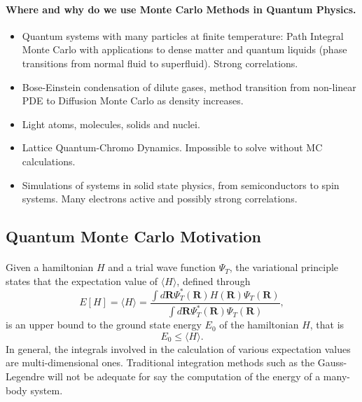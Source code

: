 \documentclass[%
twoside,                 %
final,                   %
10pt]{article}
\begin{document}
\paragraph{Where and why do we use Monte Carlo Methods in Quantum Physics.}
\begin{itemize}
\item Quantum systems with many particles at finite temperature: Path Integral Monte Carlo with applications to dense matter and quantum liquids (phase transitions from normal fluid to superfluid). Strong correlations.

\item Bose-Einstein condensation of dilute gases, method transition from  non-linear PDE to Diffusion Monte Carlo as density increases.

\item Light atoms, molecules, solids and nuclei. 

\item Lattice Quantum-Chromo Dynamics. Impossible to solve without MC calculations. 

\item Simulations of systems in solid state physics, from semiconductors to spin systems. Many electrons active and possibly strong correlations.
\end{itemize}

\noindent



\subsection*{Quantum Monte Carlo Motivation}

\paragraph{}
Given a hamiltonian $H$ and a trial wave function $\Psi_T$, the variational principle states that the expectation value of $\langle H \rangle$, defined through 
\[
   E[H]= \langle H \rangle =
   \frac{\int d\bm{R}\Psi^{\ast}_T(\bm{R})H(\bm{R})\Psi_T(\bm{R})}
        {\int d\bm{R}\Psi^{\ast}_T(\bm{R})\Psi_T(\bm{R})},
\]
is an upper bound to the ground state energy $E_0$ of the hamiltonian $H$, that is 
\[
    E_0 \le \langle H \rangle .
\]
In general, the integrals involved in the calculation of various  expectation values  are multi-dimensional ones. Traditional integration methods such as the Gauss-Legendre will not be adequate for say the  computation of the energy of a many-body system.
\end{document}
